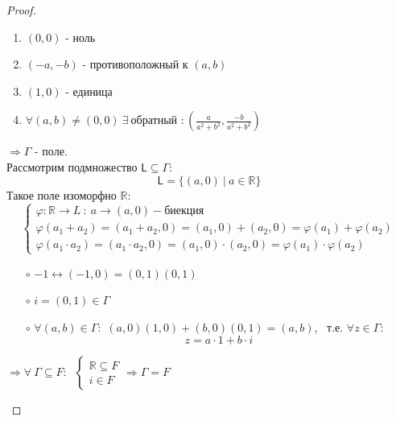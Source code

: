 \documentclass[a4paper, 12pt]{article}
\newcommand{\R}{\mathbb R}
\renewcommand{\phi}{\varphi}
\theoremstyle{definition}
\begin{document}
\begin{proof}
\begin{itemize}
\begin{enumerate}
        \item $(0,0)$ - ноль
        \item $(-a, -b)$ - противоположный к $(a, b)$
        \item $(1, 0)$ - единица
        \item $\forall (a, b) \neq (0, 0) \ \exists \ \text{обратный }: (\frac{a}{a^2+b^2}, \frac{-b}{a^2+b^2})$
      \end{enumerate} $\Longrightarrow \Gamma$ - поле.\\
      Рассмотрим подмножество $\mathsf{L} \subseteq \Gamma: $  
      $$\mathsf{L}  = \{(a, 0) \ | \ a \in \R \}$$   
      Такое поле изоморфно $\R:$
      $$\begin{cases}
        \phi: \R \to L \ : \ a \to (a, 0) - \text{биекция}\\
        \phi(a_1 + a_2) = (a_1 + a_2, 0) = (a_1, 0) + (a_2, 0) = \phi(a_1) + \phi(a_2)\\
        \phi(a_1 \cdot a_2) = (a_1 \cdot a_2, 0) = (a_1, 0) \cdot (a_2, 0) = \phi(a_1) \cdot \phi(a_2)
      \end{cases}$$
      \begin{itemize}
        \item[$\circ$] $-1 \longleftrightarrow (-1, 0) = (0, 1)(0, 1)$
        \item[$\circ$] $i = (0, 1) \in \Gamma$
        \item[$\circ$] $\forall (a, b) \in \Gamma:$
        $(a, 0)(1, 0) + (b, 0)(0, 1) = (a, b)$, \ т.е. $\forall z \in \Gamma:$ 
        $$z = a \cdot 1 + b \cdot i$$
      \end{itemize}
      $\Longrightarrow \forall \ \Gamma \subseteq F: \ $
         $\begin{cases}
        \R \subseteq F \\
        i \in F
      \end{cases} \Longrightarrow \Gamma = F$
    \end{itemize}
  \end{proof} 
\end{document}
